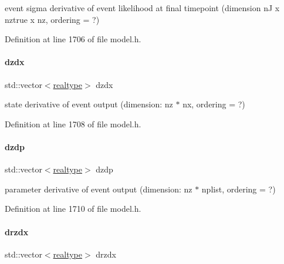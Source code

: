 event sigma derivative of event likelihood at final timepoint (dimension nJ x nztrue x nz, ordering = ?) 

Definition at line 1706 of file model.\+h.

\mbox{\label{classamici_1_1_model_a2f5f73b0bb67ee69c461c01e2dadaecc}} 
\paragraph{\texorpdfstring{dzdx}{dzdx}}
{\footnotesize\ttfamily std\+::vector$<$\mbox{\hyperlink{namespaceamici_a1bdce28051d6a53868f7ccbf5f2c14a3}{realtype}}$>$ dzdx\hspace{0.3cm}{\ttfamily [protected]}}

state derivative of event output (dimension\+: nz $\ast$ nx, ordering = ?) 

Definition at line 1708 of file model.\+h.

\mbox{\label{classamici_1_1_model_a5d743131ef6be8aa56865fd100acd137}} 
\paragraph{\texorpdfstring{dzdp}{dzdp}}
{\footnotesize\ttfamily std\+::vector$<$\mbox{\hyperlink{namespaceamici_a1bdce28051d6a53868f7ccbf5f2c14a3}{realtype}}$>$ dzdp\hspace{0.3cm}{\ttfamily [protected]}}

parameter derivative of event output (dimension\+: nz $\ast$ nplist, ordering = ?) 

Definition at line 1710 of file model.\+h.

\mbox{\label{classamici_1_1_model_acf722ef69da2112dc1c61d55c4e359ca}} 
\paragraph{\texorpdfstring{drzdx}{drzdx}}
{\footnotesize\ttfamily std\+::vector$<$\mbox{\hyperlink{namespaceamici_a1bdce28051d6a53868f7ccbf5f2c14a3}{realtype}}$>$ drzdx\hspace{0.3cm}{\ttfamily [protected]}}

